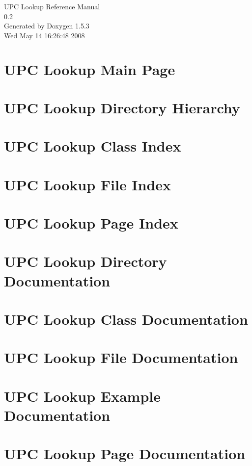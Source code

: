 \documentclass[letterpaper]{book}
\begin{document}
\begin{titlepage}
\vspace*{7cm}
\begin{center}
{\Large UPC Lookup Reference Manual\\[1ex]\large 0.2 }\\
\vspace*{1cm}
{\large Generated by Doxygen 1.5.3}\\
\vspace*{0.5cm}
{\small Wed May 14 16:26:48 2008}\\
\end{center}
\end{titlepage}
\clearemptydoublepage
{}
\tableofcontents
\clearemptydoublepage
{}
\chapter{UPC Lookup Main Page}
\label{index}\hypertarget{index}{}
\chapter{UPC Lookup Directory Hierarchy}

\chapter{UPC Lookup Class Index}

\chapter{UPC Lookup File Index}

\chapter{UPC Lookup Page Index}

\chapter{UPC Lookup Directory Documentation}

\chapter{UPC Lookup Class Documentation}

\chapter{UPC Lookup File Documentation}












\chapter{UPC Lookup Example Documentation}

\chapter{UPC Lookup Page Documentation}



\printindex
\end{document}
